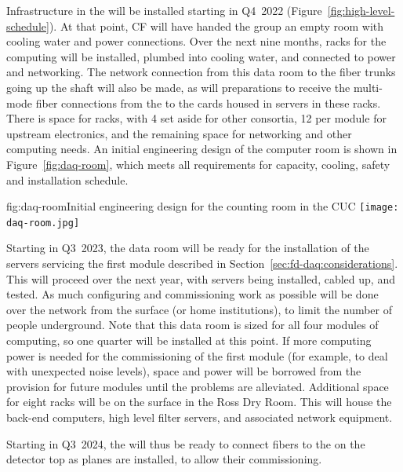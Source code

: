 
Infrastructure in the  will be installed starting in Q4~2022
(Figure~\ref{fig:high-level-schedule}).  At that point, CF will have
handed the  group an empty room with cooling water and power
connections.  Over the next nine months, racks for the  computing
will be installed, plumbed into cooling water, and connected to power
and networking.  The network connection from this data room to the fiber
trunks going up the shaft will also be made, as will preparations to
receive the multi-mode fiber connections from the  to the
 cards housed in servers in these racks. There is space
for \cucracks racks, with 4 set aside for other consortia, 12 per
module for upstream  electronics, and the remaining space for
networking and other  computing needs. An initial engineering design of the computer room is shown in Figure~\ref{fig:daq-room}, which meets all requirements for capacity, cooling, safety and installation schedule.

\begin{dunefigure}{fig:daq-room}{Initial engineering design for the  counting room in the CUC}
  \texttt{[image: daq-room.jpg]}
\end{dunefigure}

Starting in Q3~2023, the data room will be ready for the installation of
the  servers servicing the first module described in
Section~\ref{sec:fd-daq:considerations}.  This will proceed over the
next year, with servers being installed, cabled up, and tested.
As much configuring and commissioning work as possible will be done over
the network from the surface (or home institutions), to limit the number
of people underground.  Note that this data room is sized for all four
modules of  computing, so one quarter will be installed at this
point.  If more computing power is needed for the commissioning of the
first module (for example, to deal with unexpected noise levels), space
and power will be borrowed from the provision for future modules until the problems are
alleviated. 
Additional space for eight racks will be on the surface in the Ross Dry
Room. This will house the back-end computers, high level filter servers, and associated network equipment.

Starting in Q3~2024, the  will thus be ready to connect fibers to the
 on the detector top as planes are installed, to allow their commissioning.

